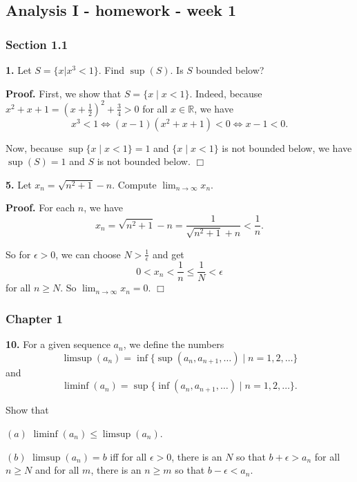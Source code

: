 \documentclass{article}
\begin{document}
    
    
    
    
    

    
    \subsection*{Analysis I - homework - week
1}\label{analysis-i---homework---week-1}

    \subsubsection*{Section 1.1}\label{section-1.1}

    \textbf{1.} Let $S = \{x | x^3 < 1\}$. Find $\sup(S)$. Is $S$ bounded
below?

\textbf{Proof.} First, we show that $S = \{x \mid x < 1\}$. Indeed,
because $x^2 + x + 1 = (x+\frac{1}{2})^2 + \frac{3}{4} > 0$ for all
$x\in \mathbb{R}$, we have
\[x^3 < 1 \Leftrightarrow (x-1)(x^2 + x + 1) < 0 \Leftrightarrow x - 1 < 0.\]

Now, because $\sup \{x \mid x < 1\} = 1$ and $\{x \mid x<1\}$ is not
bounded below, we have $\sup(S) = 1$ and $S$ is not bounded below.
$\Box$

    \textbf{5.} Let $x_n = \sqrt{n^2+1} - n$. Compute
$\lim_{n\to \infty} x_n$.

\textbf{Proof.} For each $n$, we have
\[x_n = \sqrt{n^2+1}-n = \frac{1}{\sqrt{n^2+1} + n} < \frac{1}{n}.\]

So for $\epsilon > 0$, we can choose $N > \frac{1}{\epsilon}$ and get
\[ 0 < x_n < \frac{1}{n} \le \frac{1}{N} < \epsilon \] for all $n\ge N$.
So $\lim_{n\to\infty}x_n = 0.$ $\Box$

    \subsubsection*{Chapter 1}\label{chapter-1}

    \textbf{10.} For a given sequence $a_n$, we define the numbers
\[ \limsup(a_n) = \inf\{\sup(a_n,a_{n+1},\ldots)\mid n = 1,2,\ldots\}\]
and
\[\liminf(a_n) = \sup\{\inf(a_n,a_{n+1},\ldots)\mid n = 1,2,\ldots\}.\]

Show that

$(a)$ $\liminf(a_n)\le \limsup(a_n)$.

$(b)$ $\limsup(a_n) = b$ iff for all $\epsilon > 0$, there is an $N$ so
that $b+\epsilon > a_n$ for all $n \ge N$ and for all $m$, there is an
$n \ge m$ so that $b-\epsilon < a_n$.
\end{document}
